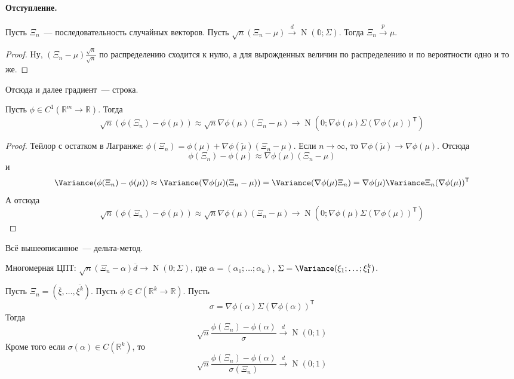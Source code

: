 \documentclass{article}
\begin{document}
    \paragraph{Отступление.}
    \begin{claim}
        Пусть $\Xi_n$~--- последовательность случайных векторов. Пусть $\sqrt n(\Xi_n-\mu)\overset d\longrightarrow\operatorname{N}(\mathbb0;\Sigma)$. Тогда $\Xi_n\overset p\rightarrow\mu$.
    \end{claim}
    \begin{proof}
        Ну, $(\Xi_n-\mu)\frac{\sqrt n}{\sqrt n}$ по распределению сходится к нулю, а для вырожденных величин по распределению и по вероятности одно и то же.
    \end{proof}
    \begin{remark}
        Отсюда и далее градиент~--- строка.
    \end{remark}
    \begin{claim}
        Пусть $\phi\in C^1(\mathbb R^m\to\mathbb R)$. Тогда
        \[
        \sqrt n(\phi(\Xi_n)-\phi(\mu))\approx\sqrt n\nabla\phi(\mu)(\Xi_n-\mu)\rightarrow\operatorname{N}(0;\nabla\phi(\mu)\Sigma(\nabla\phi(\mu))^{\mathsf T})
        \]
    \end{claim}
    \begin{proof}
        Тейлор с остатком в Лагранже:
        $\phi(\Xi_n)=\phi(\mu)+\nabla\phi(\tilde{\mu})(\Xi_n-\mu)$. Если $n\to\infty$, то $\nabla\phi(\tilde{\mu})\to\nabla\phi(\mu)$. Отсюда
        \[
        \phi(\Xi_n)-\phi(\mu)\approx\nabla\phi(\mu)(\Xi_n-\mu)
        \]
        и
        \[
        \Variance(\phi(\Xi_n)-\phi(\mu))\approx\Variance(\nabla\phi(\mu)(\Xi_n-\mu))=\Variance(\nabla\phi(\mu)\Xi_n)=\nabla\phi(\mu)\Variance\Xi_n(\nabla\phi(\mu))^{\mathsf T}
        \]
        А отсюда
        \[
        \sqrt n(\phi(\Xi_n)-\phi(\mu))\approx\sqrt n\nabla\phi(\mu)(\Xi_n-\mu)\rightarrow\operatorname{N}(0;\nabla\phi(\mu)\Sigma(\nabla\phi(\mu))^{\mathsf T})
        \]
    \end{proof}
    \begin{definition}
        Всё вышеописанное~--- дельта-метод.
    \end{definition}
    \begin{theorem}
        Многомерная ЦПТ: $\sqrt n(\Xi_n-\alpha)\overline d\rightarrow\operatorname{N}(0;\Sigma)$, где $\alpha=(\alpha_1;\ldots;\alpha_k)$, $\Sigma=\Variance(\xi_1;\ldots;\xi_1^k)$.
    \end{theorem}
    \begin{theorem}
        Пусть $\Xi_n=\left(\overline{\xi},\ldots,\overline{\xi^k}\right)$. Пусть $\phi\in C(\mathbb R^k\to\mathbb R)$. Пусть
        \[
        \sigma=\nabla\phi(\alpha)\Sigma(\nabla\phi(\alpha))^{\mathsf T}
        \]
        Тогда
        \[
        \sqrt n\frac{\phi(\Xi_n)-\phi(\alpha)}{\sigma}\overset d\longrightarrow\operatorname{N}(0;1)
        \]
        Кроме того если $\sigma(\alpha)\in C(\mathbb R^k)$, то
        \[
        \sqrt n\frac{\phi(\Xi_n)-\phi(\alpha)}{\sigma(\Xi_n)}\overset d\longrightarrow\operatorname{N}(0;1)
        \]
    \end{theorem}
\end{document}
